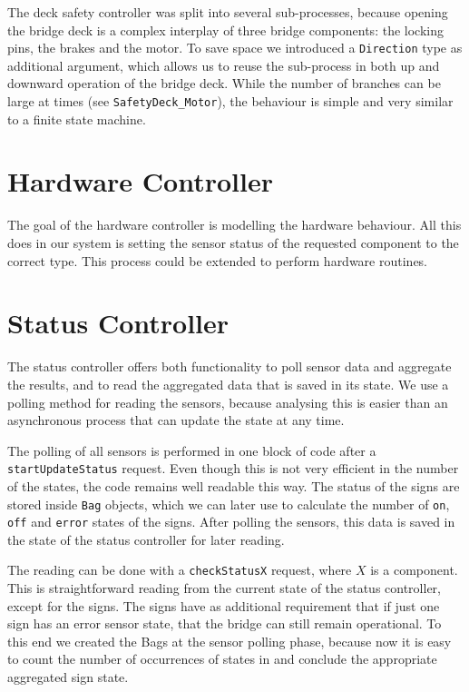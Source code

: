  	 The deck safety controller was split into several sub-processes,
 	 because opening the bridge deck is a complex interplay of three bridge components:
 	 the locking pins, the brakes and the motor.
 	 To save space we introduced a \texttt{Direction} type as additional argument,
 	 which allows us to reuse the sub-process in both up and downward operation of the bridge deck.
 	 While the number of branches can be large at times (see \texttt{SafetyDeck\_Motor}),
 	 the behaviour is simple and very similar to a finite state machine. 

	\section{Hardware Controller}
		The goal of the hardware controller is modelling the hardware behaviour.
		All this does in our system is setting the sensor status of the requested component to the correct type.
		This process could be extended to perform hardware routines.

	\section{Status Controller}
		The status controller offers both functionality to poll sensor data and aggregate the results,
		and to read the aggregated data that is saved in its state.
		We use a polling method for reading the sensors,
		because analysing this is easier than an asynchronous process that can update the state at any time.

		The polling of all sensors is performed in one block of code after a \texttt{startUpdateStatus} request.
		Even though this is not very efficient in the number of the states,
		the code remains well readable this way.
		The status of the signs are stored inside \texttt{Bag} objects,
		which we can later use to calculate the number of \texttt{on}, \texttt{off} and \texttt{error} states of the signs.
		After polling the sensors, this data is saved in the state of the status controller for later reading.

		The reading can be done with a \texttt{checkStatusX} request,
		where $X$ is a component.
		This is straightforward reading from the current state of the status controller,
		except for the signs.
		The signs have as additional requirement that if just one sign has an error sensor state,
		that the bridge can still remain operational.
		To this end we created the Bags at the sensor polling phase,
		because now it is easy to count the number of occurrences of states in and conclude the appropriate aggregated sign state.
		
